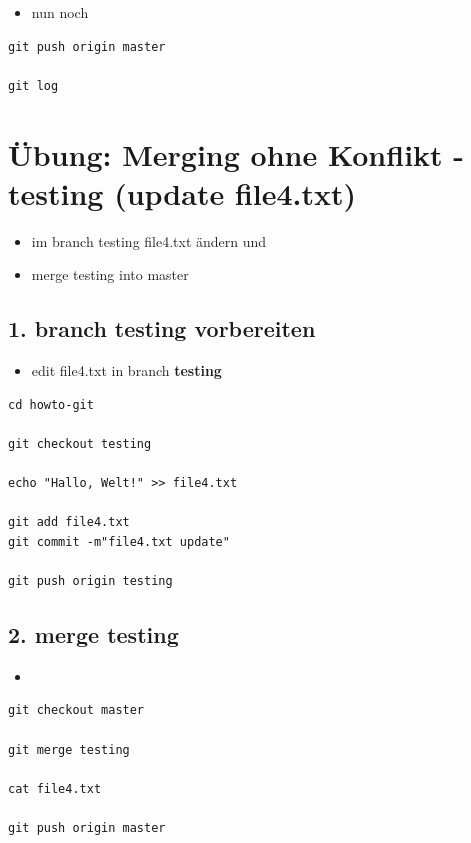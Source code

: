 \documentclass[11pt]{article}
\begin{document}
\begin{itemize}
\item nun noch
\end{itemize}
\begin{verbatim}
git push origin master

git log
\end{verbatim}


\section{Übung: Merging ohne Konflikt - testing (update file4.txt)}
\label{sec:org018b828}

\begin{itemize}
\item im branch testing file4.txt ändern und
\item merge testing into master
\end{itemize}


\subsection{1. branch testing vorbereiten}
\label{sec:org7c35b35}
\begin{itemize}
\item edit file4.txt in branch \textbf{testing}
\end{itemize}

\begin{verbatim}
cd howto-git

git checkout testing

echo "Hallo, Welt!" >> file4.txt

git add file4.txt
git commit -m"file4.txt update"

git push origin testing
\end{verbatim}

\subsection{2. merge testing}
\label{sec:org9b29954}
\begin{itemize}
\item 
\end{itemize}
\begin{verbatim}
git checkout master

git merge testing

cat file4.txt

git push origin master
\end{verbatim}
\end{document}
